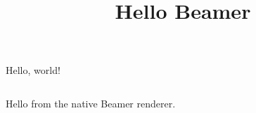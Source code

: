 \documentclass[aspectratio=169]{beamer}
\title{Hello Beamer}
\author{}
\date{}
\begin{document}
\begin{frame}{Hello, world!}
  \begin{columns}[T,totalwidth=\textwidth]
    \begin{column}{\textwidth}
      Hello from the native Beamer renderer.
    \end{column}
  \end{columns}
\end{frame}
\end{document}
